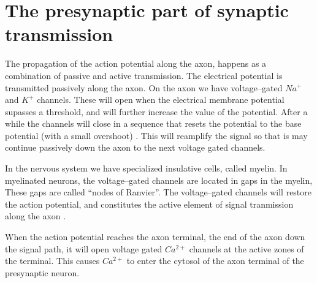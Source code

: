 \section{The presynaptic part of synaptic transmission}
\label{appendixSecPresynapticSynapticPartOfTransmission}
The propagation of the action potential along the axon, happens as a combination of passive and active transmission.
The electrical potential is transmitted passively along the axon. On the axon we have voltage--gated $Na^+$ and $K^+$ channels.
These will open when the electrical membrane potential supasses a threshold, and will further increase the value of the potential. 
After a while the channels will close in a sequence that resets the potential to the base potential (with a small overshoot) \cite{PrinciplesOfNeuralScience4edKAP09}. 
This will reamplify the signal  so that is may continue passively down the axon to the next voltage gated channels.

In the nervous system we have specialized insulative cells, called myelin.
In myelinated neurons, the voltage--gated channels are located in gaps in the myelin, These gaps are called ``nodes of Ranvier''.
The voltage--gated channels will restore the action potential, and constitutes the active element of signal tranmission along the axon \cite{PrinciplesOfNeuralScience4edKAP09}.



When the action potential reaches the axon terminal, the end of the axon down the signal path, it will open voltage gated $Ca^{2+}$ channels at the active zones of the terminal. 
This causes $Ca^{2+}$ to enter the cytosol of the axon terminal of the presynaptic neuron\cite{PrinciplesOfNeuralScience4edKAP10}.

